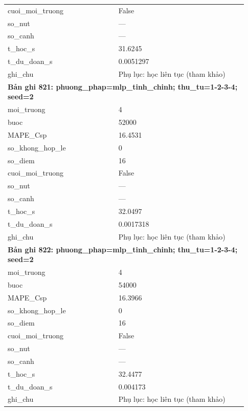 \begin{longtable}{p{0.43\linewidth}p{0.50\linewidth}}
cuoi\_\allowbreak moi\_\allowbreak truong & False \\
so\_\allowbreak nut & — \\
so\_\allowbreak canh & — \\
t\_\allowbreak hoc\_\allowbreak s & 31.6245 \\
t\_\allowbreak du\_\allowbreak doan\_\allowbreak s & 0.0051297 \\
ghi\_\allowbreak chu & Phụ lục: học liên tục (tham khảo) \\
\midrule
\multicolumn{2}{p{0.95\linewidth}}{\textbf{Bản ghi 821: phuong\_phap=mlp\_tinh\_chinh; thu\_tu=1-2-3-4; seed=2}} \\
moi\_\allowbreak truong & 4 \\
buoc & 52000 \\
MAPE\_\allowbreak Csp & 16.4531 \\
so\_\allowbreak khong\_\allowbreak hop\_\allowbreak le & 0 \\
so\_\allowbreak diem & 16 \\
cuoi\_\allowbreak moi\_\allowbreak truong & False \\
so\_\allowbreak nut & — \\
so\_\allowbreak canh & — \\
t\_\allowbreak hoc\_\allowbreak s & 32.0497 \\
t\_\allowbreak du\_\allowbreak doan\_\allowbreak s & 0.0017318 \\
ghi\_\allowbreak chu & Phụ lục: học liên tục (tham khảo) \\
\midrule
\multicolumn{2}{p{0.95\linewidth}}{\textbf{Bản ghi 822: phuong\_phap=mlp\_tinh\_chinh; thu\_tu=1-2-3-4; seed=2}} \\
moi\_\allowbreak truong & 4 \\
buoc & 54000 \\
MAPE\_\allowbreak Csp & 16.3966 \\
so\_\allowbreak khong\_\allowbreak hop\_\allowbreak le & 0 \\
so\_\allowbreak diem & 16 \\
cuoi\_\allowbreak moi\_\allowbreak truong & False \\
so\_\allowbreak nut & — \\
so\_\allowbreak canh & — \\
t\_\allowbreak hoc\_\allowbreak s & 32.4477 \\
t\_\allowbreak du\_\allowbreak doan\_\allowbreak s & 0.004173 \\
ghi\_\allowbreak chu & Phụ lục: học liên tục (tham khảo) \\

\end{longtable}
